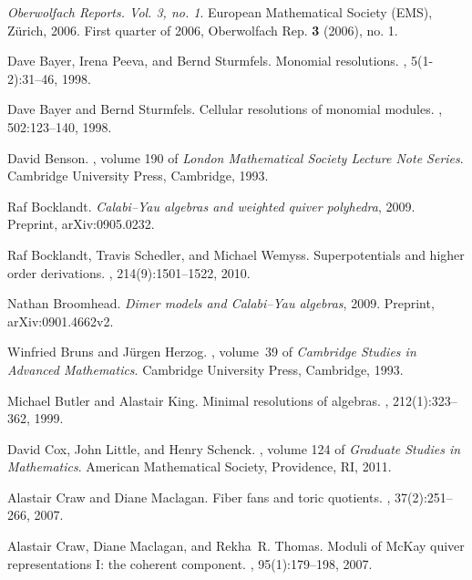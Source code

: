 \documentclass[11pt,a4paper]{amsart}
\numberwithin{equation}{section}
\theoremstyle{definition}
\theoremstyle{remark}
\begin{document}
\def\cprime{$'$}
\begin{thebibliography}{10}

{\em Oberwolfach {R}eports. {V}ol. 3, no. 1}.
\newblock European Mathematical Society (EMS), Z\"urich, 2006.
\newblock First quarter of 2006, Oberwolfach Rep. {{\bf{3}}} (2006), no. 1.

Dave Bayer, Irena Peeva, and Bernd Sturmfels.
\newblock Monomial resolutions.
, 5(1-2):31--46, 1998.

Dave Bayer and Bernd Sturmfels.
\newblock Cellular resolutions of monomial modules.
, 502:123--140, 1998.

David Benson.
, volume 190 of {\em
  London Mathematical Society Lecture Note Series}.
\newblock Cambridge University Press, Cambridge, 1993.

Raf Bocklandt.
\newblock \emph{Calabi--Yau algebras and weighted quiver polyhedra}, 2009.
\newblock Preprint, arXiv:0905.0232.

Raf Bocklandt, Travis Schedler, and Michael Wemyss.
\newblock Superpotentials and higher order derivations.
, 214(9):1501--1522, 2010.

Nathan Broomhead.
\newblock \emph{Dimer models and Calabi--Yau algebras}, 2009.
\newblock Preprint, arXiv:0901.4662v2.

Winfried Bruns and J{\"u}rgen Herzog.
, volume~39 of {\em Cambridge Studies in
  Advanced Mathematics}.
\newblock Cambridge University Press, Cambridge, 1993.

Michael Butler and Alastair King.
\newblock Minimal resolutions of algebras.
, 212(1):323--362, 1999.

David Cox, John Little, and Henry Schenck.
, volume 124 of {\em Graduate Studies in
  Mathematics}.
\newblock American Mathematical Society, Providence, RI, 2011.

Alastair Craw and Diane Maclagan.
\newblock Fiber fans and toric quotients.
, 37(2):251--266, 2007.

Alastair Craw, Diane Maclagan, and Rekha~R. Thomas.
\newblock Moduli of {M}c{K}ay quiver representations {I}: the coherent
  component.
, 95(1):179--198, 2007.


\end{thebibliography}
\end{document}
